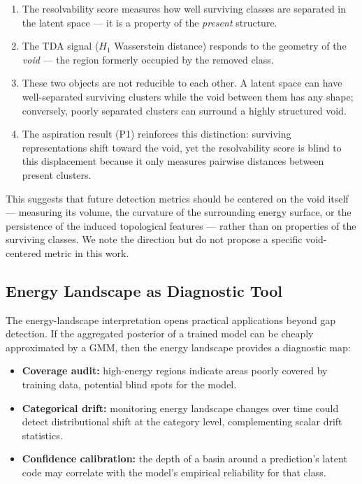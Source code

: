 \documentclass[11pt]{article}
\begin{document}
\begin{enumerate}
\item The resolvability score measures how well surviving classes are
separated in the latent space --- it is a property of the \emph{present}
structure.

\item The TDA signal ($H_1$ Wasserstein distance) responds to the geometry
of the \emph{void} --- the region formerly occupied by the removed class.

\item These two objects are not reducible to each other.
A latent space can have well-separated surviving clusters while the void
between them has any shape; conversely, poorly separated clusters can
surround a highly structured void.

\item The aspiration result (P1) reinforces this distinction: surviving
representations shift toward the void, yet the resolvability score is blind
to this displacement because it only measures pairwise distances between
present clusters.
\end{enumerate}

This suggests that future detection metrics should be centered on the
void itself --- measuring its volume, the curvature of the surrounding
energy surface, or the persistence of the induced topological features ---
rather than on properties of the surviving classes.
We note the direction but do not propose a specific void-centered metric
in this work.


\subsection{Energy Landscape as Diagnostic Tool}
\label{sec:diagnostic}

The energy-landscape interpretation opens practical applications beyond
gap detection.
If the aggregated posterior of a trained model can be cheaply approximated
by a GMM, then the energy landscape provides a diagnostic map:

\begin{itemize}
\item \textbf{Coverage audit:} high-energy regions indicate areas poorly
covered by training data, potential blind spots for the model.
\item \textbf{Categorical drift:} monitoring energy landscape changes over
time could detect distributional shift at the category level, complementing
scalar drift statistics.
\item \textbf{Confidence calibration:} the depth of a basin around a
prediction's latent code may correlate with the model's empirical reliability
for that class.
\end{itemize}
\end{document}
